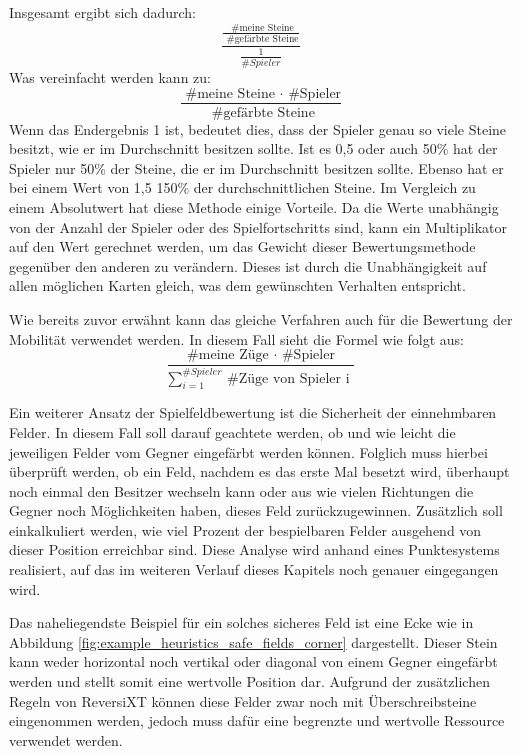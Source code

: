 \documentclass[12pt,a4paper,bibliography=totocnumbered,listof=totocnumbered]{article}
\begin{document}
Insgesamt ergibt sich dadurch:
\[ \frac{ \frac{\text{ \# meine Steine}}{\text{ \# gefärbte Steine}} }{ \frac{1}{ \# Spieler} } \]
Was vereinfacht werden kann zu:
\[ \frac{ \text{ \# meine Steine } \cdot \text{ \# Spieler} }{ \text{ \# gefärbte Steine} } \] 
Wenn das Endergebnis 1 ist, bedeutet dies, dass der Spieler genau so viele Steine besitzt, wie er im Durchschnitt besitzen sollte. Ist es 0,5 oder auch 50\% hat der Spieler nur 50\% der Steine, die er im Durchschnitt besitzen sollte. Ebenso hat er bei einem Wert von 1,5 150\% der durchschnittlichen Steine.
Im Vergleich zu einem Absolutwert hat diese Methode einige Vorteile. Da die Werte unabhängig von der Anzahl der Spieler oder des Spielfortschritts sind, kann ein Multiplikator auf den Wert gerechnet werden, um das Gewicht dieser Bewertungsmethode gegenüber den anderen zu verändern. Dieses ist durch die Unabhängigkeit auf allen möglichen Karten gleich, was dem gewünschten Verhalten entspricht.

Wie bereits zuvor erwähnt kann das gleiche Verfahren auch für die Bewertung der Mobilität verwendet werden. In diesem Fall sieht die Formel wie folgt aus:
\[ \frac{ \text{ \# meine Züge } \cdot \text{ \# Spieler } }{ \sum_{i=1}^{ \#Spieler} \text{ \# Züge von Spieler i } }  \]


Ein weiterer Ansatz der Spielfeldbewertung ist die \glqq Sicherheit\grqq{} der einnehmbaren Felder. In diesem Fall soll darauf geachtete werden, ob und wie leicht die jeweiligen Felder vom Gegner eingefärbt werden können. Folglich muss hierbei überprüft werden, ob ein Feld, nachdem es das erste Mal besetzt wird, überhaupt noch einmal den Besitzer wechseln kann oder aus wie vielen Richtungen die Gegner noch Möglichkeiten haben, dieses Feld zurückzugewinnen. Zusätzlich soll einkalkuliert werden, wie viel Prozent der bespielbaren Felder ausgehend von dieser Position erreichbar sind. Diese Analyse wird anhand eines Punktesystems realisiert, auf das im weiteren Verlauf dieses Kapitels noch genauer eingegangen wird.

Das naheliegendste Beispiel für ein solches sicheres Feld ist eine Ecke wie in Abbildung \ref{fig:example_heuristics_safe_fields_corner} dargestellt. Dieser Stein kann weder horizontal noch vertikal oder diagonal von einem Gegner eingefärbt werden und stellt somit eine wertvolle Position dar. Aufgrund der zusätzlichen Regeln von ReversiXT können diese Felder zwar noch mit Überschreibsteine eingenommen werden, jedoch muss dafür eine begrenzte und wertvolle Ressource verwendet werden.
\end{document}
